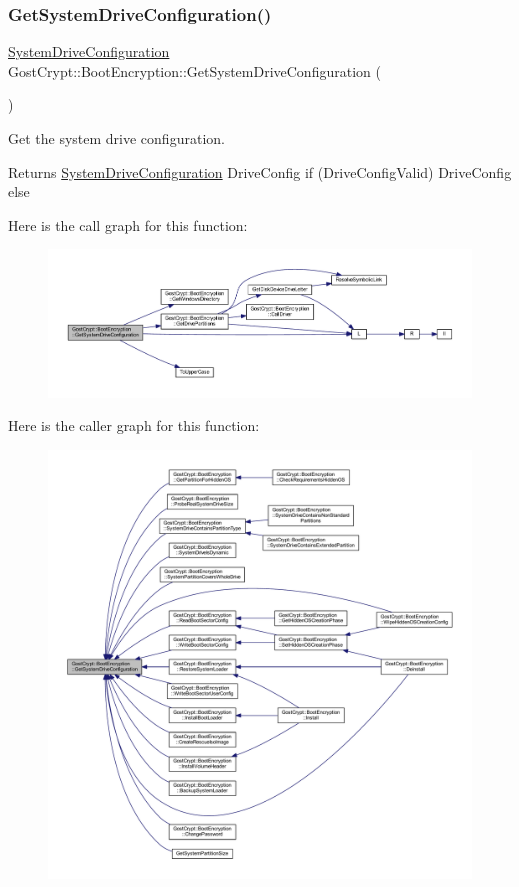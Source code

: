 \subsubsection{\texorpdfstring{Get\+System\+Drive\+Configuration()}{GetSystemDriveConfiguration()}}
{\footnotesize\ttfamily \hyperlink{struct_gost_crypt_1_1_system_drive_configuration}{System\+Drive\+Configuration} Gost\+Crypt\+::\+Boot\+Encryption\+::\+Get\+System\+Drive\+Configuration (\begin{DoxyParamCaption}{ }\end{DoxyParamCaption})}



Get the system drive configuration. 

\begin{DoxyReturn}{Returns}
\hyperlink{struct_gost_crypt_1_1_system_drive_configuration}{System\+Drive\+Configuration} Drive\+Config if (Drive\+Config\+Valid) Drive\+Config else 
\end{DoxyReturn}
Here is the call graph for this function\+:
\nopagebreak
\begin{figure}[H]
\begin{center}
\leavevmode
\includegraphics[width=350pt]{class_gost_crypt_1_1_boot_encryption_ab325c58a9939344bdfe056d20df0f5ff_cgraph}
\end{center}
\end{figure}
Here is the caller graph for this function\+:
\nopagebreak
\begin{figure}[H]
\begin{center}
\leavevmode
\includegraphics[width=350pt]{class_gost_crypt_1_1_boot_encryption_ab325c58a9939344bdfe056d20df0f5ff_icgraph}
\end{center}
\end{figure}
